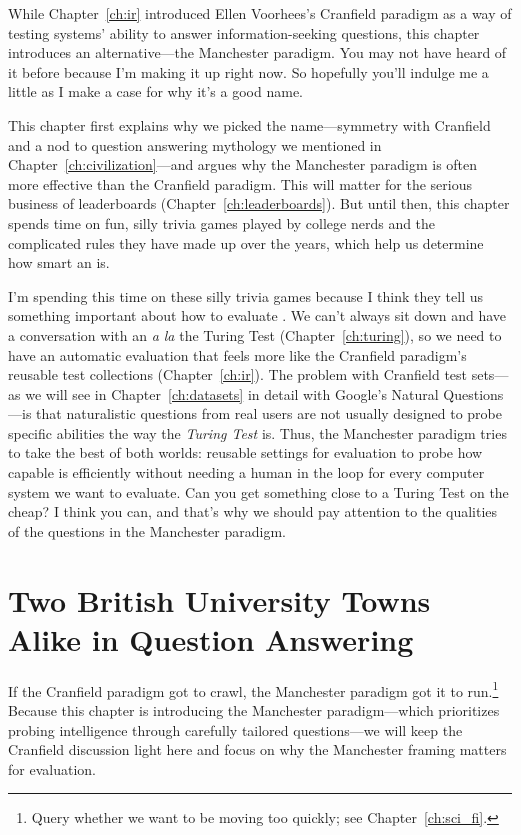 
While Chapter~\ref{ch:ir} introduced Ellen Voorhees's Cranfield
paradigm as a way of testing systems' ability to answer
information-seeking questions, this chapter introduces an
alternative---the Manchester paradigm.
%
You may not have heard of it before because I'm making it up right now.
%
So hopefully you'll indulge me a little as I make a case for why it's a
good name.

This chapter first explains why we picked the name---symmetry with
Cranfield and a nod to question answering mythology we mentioned in
Chapter~\ref{ch:civilization}---and argues why the Manchester paradigm
is often more effective than the Cranfield paradigm.
%
This will matter for the
serious business of leaderboards (Chapter~\ref{ch:leaderboards}). But
until then, this chapter spends time on fun, silly trivia games played
by college nerds and the complicated rules they have made up over the
years, which help us determine how smart an  is.

I'm spending this time on these silly trivia games because I think
they tell us something important about how to evaluate .
%
We can't always sit down and have a conversation with an 
\textit{a la} the Turing Test (Chapter~\ref{ch:turing}), so we need to
have an automatic evaluation that feels more like the Cranfield
paradigm's reusable test collections (Chapter~\ref{ch:ir}).
%
The problem with Cranfield test sets---as we will see in
Chapter~\ref{ch:datasets} in detail with Google's Natural
Questions---is that naturalistic questions from real users are not
usually designed to probe specific abilities the way the \emph{Turing
Test} is.
%
Thus, the Manchester paradigm tries to take the best of both worlds:
reusable settings for  evaluation to probe how capable
 is efficiently without needing a human in the loop for every
computer system we want to evaluate.
%
Can you get something close to a Turing Test on the cheap?
%
I think you can, and that's why we should pay attention to the
qualities of the questions in the Manchester paradigm.

\section{Two British University Towns Alike in Question Answering}
\label{sec:manchester:name}

If the Cranfield paradigm got
 to crawl, the Manchester paradigm got it to
run.\footnote{Query whether we want  to be moving too quickly;
  see Chapter~\ref{ch:sci_fi}.}
%
Because this chapter is introducing the Manchester paradigm---which
prioritizes probing intelligence through carefully tailored questions---we
will keep the Cranfield discussion light here and focus on why the
Manchester framing matters for evaluation.

